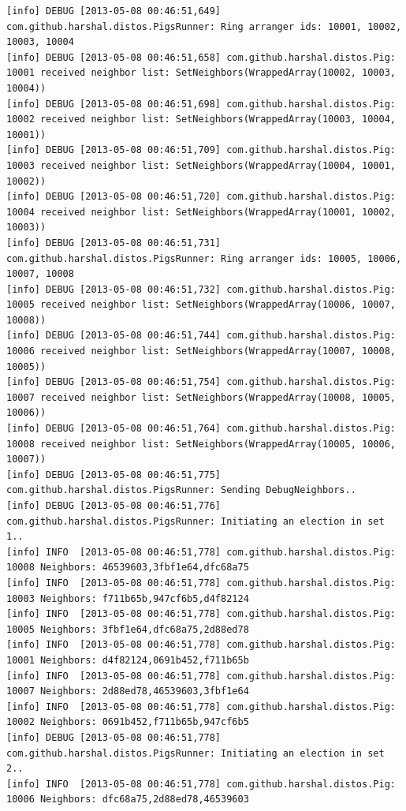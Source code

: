 \documentclass[]{article}
\begin{document}
\tiny\begin{verbatim}
[info] DEBUG [2013-05-08 00:46:51,649] com.github.harshal.distos.PigsRunner: Ring arranger ids: 10001, 10002, 10003, 10004
[info] DEBUG [2013-05-08 00:46:51,658] com.github.harshal.distos.Pig: 10001 received neighbor list: SetNeighbors(WrappedArray(10002, 10003, 10004))
[info] DEBUG [2013-05-08 00:46:51,698] com.github.harshal.distos.Pig: 10002 received neighbor list: SetNeighbors(WrappedArray(10003, 10004, 10001))
[info] DEBUG [2013-05-08 00:46:51,709] com.github.harshal.distos.Pig: 10003 received neighbor list: SetNeighbors(WrappedArray(10004, 10001, 10002))
[info] DEBUG [2013-05-08 00:46:51,720] com.github.harshal.distos.Pig: 10004 received neighbor list: SetNeighbors(WrappedArray(10001, 10002, 10003))
[info] DEBUG [2013-05-08 00:46:51,731] com.github.harshal.distos.PigsRunner: Ring arranger ids: 10005, 10006, 10007, 10008
[info] DEBUG [2013-05-08 00:46:51,732] com.github.harshal.distos.Pig: 10005 received neighbor list: SetNeighbors(WrappedArray(10006, 10007, 10008))
[info] DEBUG [2013-05-08 00:46:51,744] com.github.harshal.distos.Pig: 10006 received neighbor list: SetNeighbors(WrappedArray(10007, 10008, 10005))
[info] DEBUG [2013-05-08 00:46:51,754] com.github.harshal.distos.Pig: 10007 received neighbor list: SetNeighbors(WrappedArray(10008, 10005, 10006))
[info] DEBUG [2013-05-08 00:46:51,764] com.github.harshal.distos.Pig: 10008 received neighbor list: SetNeighbors(WrappedArray(10005, 10006, 10007))
[info] DEBUG [2013-05-08 00:46:51,775] com.github.harshal.distos.PigsRunner: Sending DebugNeighbors..
[info] DEBUG [2013-05-08 00:46:51,776] com.github.harshal.distos.PigsRunner: Initiating an election in set 1..
[info] INFO  [2013-05-08 00:46:51,778] com.github.harshal.distos.Pig: 10008 Neighbors: 46539603,3fbf1e64,dfc68a75
[info] INFO  [2013-05-08 00:46:51,778] com.github.harshal.distos.Pig: 10003 Neighbors: f711b65b,947cf6b5,d4f82124
[info] INFO  [2013-05-08 00:46:51,778] com.github.harshal.distos.Pig: 10005 Neighbors: 3fbf1e64,dfc68a75,2d88ed78
[info] INFO  [2013-05-08 00:46:51,778] com.github.harshal.distos.Pig: 10001 Neighbors: d4f82124,0691b452,f711b65b
[info] INFO  [2013-05-08 00:46:51,778] com.github.harshal.distos.Pig: 10007 Neighbors: 2d88ed78,46539603,3fbf1e64
[info] INFO  [2013-05-08 00:46:51,778] com.github.harshal.distos.Pig: 10002 Neighbors: 0691b452,f711b65b,947cf6b5
[info] DEBUG [2013-05-08 00:46:51,778] com.github.harshal.distos.PigsRunner: Initiating an election in set 2..
[info] INFO  [2013-05-08 00:46:51,778] com.github.harshal.distos.Pig: 10006 Neighbors: dfc68a75,2d88ed78,46539603

\end{verbatim}
\end{document}
